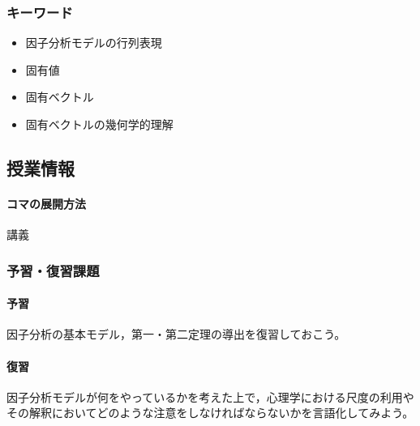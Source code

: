 \subsubsection{キーワード}
\begin{itemize}
	\item 因子分析モデルの行列表現
	\item 固有値
	\item 固有ベクトル
	\item 固有ベクトルの幾何学的理解
\end{itemize}
\subsection{授業情報}
\paragraph{コマの展開方法}
講義
\subsubsection{予習・復習課題}
\paragraph{予習}因子分析の基本モデル，第一・第二定理の導出を復習しておこう。
\paragraph{復習}因子分析モデルが何をやっているかを考えた上で，心理学における尺度の利用やその解釈においてどのような注意をしなければならないかを言語化してみよう。
